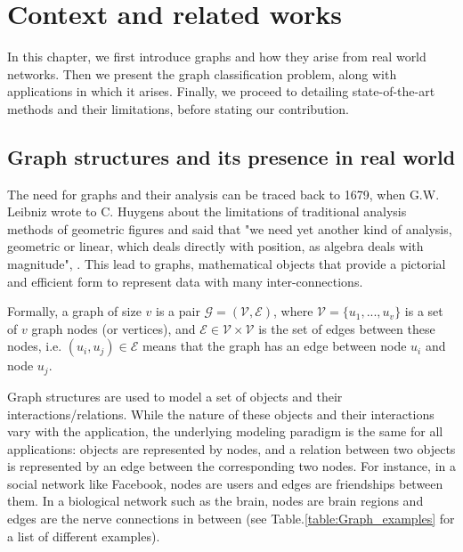 \addchapheadtotoc
\chapter{Context and related works}

In this chapter, we first introduce graphs and how they arise from real world networks. Then we present the graph classification problem, along with applications in which it arises. Finally, we proceed to detailing state-of-the-art methods and their limitations, before stating our contribution. 
 
\section{Graph structures and its presence in real world}

The need for graphs and their analysis can be traced back to 1679, when G.W.  Leibniz  wrote to C. Huygens about the limitations of traditional analysis methods of geometric figures and said that "we need yet another kind of analysis, geometric or linear, which deals directly with position, as algebra deals with magnitude", \citep{Graph_application}. This lead to graphs, mathematical objects that provide a pictorial and efficient form to represent data with many inter-connections. %

Formally, a graph of size $v$ is a pair $\mathcal{G}=(\mathcal{V},\mathcal{E})$, where $\mathcal{V}=\{u_1,...,u_v\}$ is a set of $v$ graph nodes (or vertices), and $\mathcal{E}\in \mathcal{V}\times \mathcal{V}$ is the set of edges between these nodes, i.e. $(u_i, u_j)\in \mathcal{E}$ means that the graph has an edge between node $u_i$ and node $u_j$.

Graph structures are used to model a set of objects and their interactions/relations. %
While the nature of these objects and their interactions vary with the application, the underlying modeling paradigm is the same for all applications: objects are represented by nodes, and a relation between two objects is represented by an edge between the corresponding two nodes. For instance, in a social network like Facebook, nodes are users and edges are friendships between them. In a biological network such as the brain, nodes are brain regions and edges are the nerve connections in between (see Table.\ref{table:Graph_examples} for a list of different examples). 

